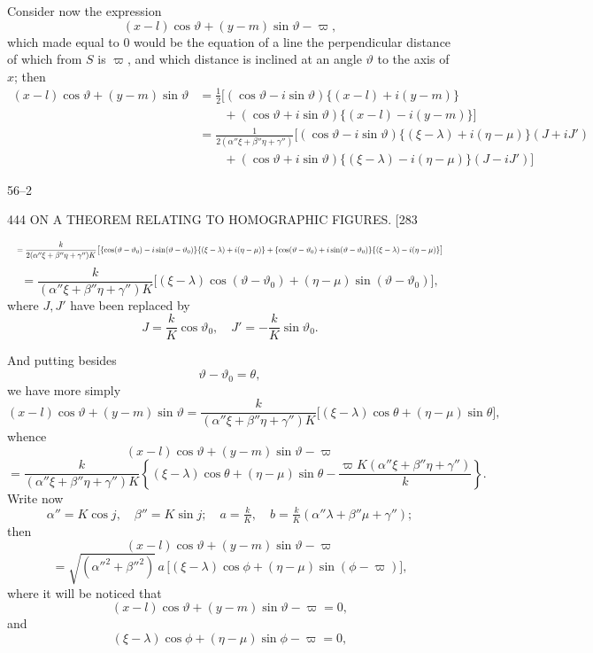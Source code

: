\documentclass[11pt]{article}
\begin{document}
Consider now the expression
\[ (x-l)\cos\vartheta+(y-m)\sin\vartheta-\varpi, \]
which made equal to 0 would be the equation of a line the perpendicular distance
of which from $S$ is $\varpi$, and which distance is inclined at an angle $\vartheta$
to the axis of $x$; then
\begin{align*}
(x-l)\cos\vartheta+(y-m)\sin\vartheta
 &= \tfrac{1}{2}[(\cos\vartheta-i\sin\vartheta)\{(x-l)+i(y-m)\}\\
 &\qquad +(\cos\vartheta+i\sin\vartheta)\{(x-l)-i(y-m)\}]\\
 &= \tfrac{1}{2(\alpha''\xi+\beta''\eta+\gamma'')}\bigl[(\cos\vartheta-i\sin\vartheta)\{(\xi-\lambda)+i(\eta-\mu)\}(J+iJ')\\
 &\qquad +(\cos\vartheta+i\sin\vartheta)\{(\xi-\lambda)-i(\eta-\mu)\}(J-iJ')\bigr]
\end{align*}

\begin{center}56--2\end{center}

\begin{center}
444 \hfill ON A THEOREM RELATING TO HOMOGRAPHIC FIGURES. \hfill \textsc{[283}
\end{center}

\[ \resizebox{\textwidth}{!}{$\displaystyle
=\dfrac{k}{2(\alpha''\xi+\beta''\eta+\gamma'')K}\bigl[\{\cos(\vartheta-\vartheta_{0})-i\sin(\vartheta-\vartheta_{0})\}\{(\xi-\lambda)+i(\eta-\mu)\}+\{\cos(\vartheta-\vartheta_{0})+i\sin(\vartheta-\vartheta_{0})\}\{(\xi-\lambda)-i(\eta-\mu)\}\bigr]
$} \]
\[ =\dfrac{k}{(\alpha''\xi+\beta''\eta+\gamma'')K}\bigl[(\xi-\lambda)\cos(\vartheta-\vartheta_{0})+(\eta-\mu)\sin(\vartheta-\vartheta_{0})\bigr], \]
where $J,J'$ have been replaced by
\[ J=\dfrac{k}{K}\cos\vartheta_{0},\quad J'=-\dfrac{k}{K}\sin\vartheta_{0}. \]

And putting besides
\[ \vartheta-\vartheta_{0}=\theta, \]
we have more simply
\[ (x-l)\cos\vartheta+(y-m)\sin\vartheta=\dfrac{k}{(\alpha''\xi+\beta''\eta+\gamma'')K}\bigl[(\xi-\lambda)\cos\theta+(\eta-\mu)\sin\theta\bigr], \]
whence
\[ (x-l)\cos\vartheta+(y-m)\sin\vartheta-\varpi \]
\[ =\dfrac{k}{(\alpha''\xi+\beta''\eta+\gamma'')K}\left\{(\xi-\lambda)\cos\theta+(\eta-\mu)\sin\theta-\dfrac{\varpi K(\alpha''\xi+\beta''\eta+\gamma'')}{k}\right\}. \]
Write now
\[ \alpha''=K\cos j,\quad \beta''=K\sin j;\quad a=\tfrac{k}{K},\quad b=\tfrac{k}{K}(\alpha''\lambda+\beta''\mu+\gamma''); \]
then
\[ (x-l)\cos\vartheta+(y-m)\sin\vartheta-\varpi \]
\[ =\sqrt{(\alpha''^{2}+\beta''^{2})}\,a\,\bigl[(\xi-\lambda)\cos\phi+(\eta-\mu)\sin(\phi-\varpi)\bigr], \]
where it will be noticed that
\[ (x-l)\cos\vartheta+(y-m)\sin\vartheta-\varpi=0, \]
and
\[ (\xi-\lambda)\cos\phi+(\eta-\mu)\sin\phi-\varpi=0, \]
\end{document}
